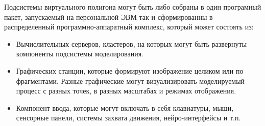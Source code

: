 Подсистемы виртуального полигона могут быть либо собраны в один програмный пакет, запускаемый на персональной ЭВМ так и сформированны в распределенный программно-аппаратный комплекс, который может состоять из:
\begin{itemize}
	\item 	Вычислительных серверов, кластеров, на которых 
			могут быть развернуты компоненты подсистемы моделирования.
	\item 	Графических станции, которые формируют изображение 
			целиком или по фрагментами. Разные графические могут 
			визуализировать моделируемый процесс с разных точек, 
			в разных масштабах и режимах отображения.
	\item 	Компонент ввода, которые могут включать в себя клавиатуры, 
			мыши, сенсорные панели, системы захвата движения, нейро-интерфейсы и т.п.
\end{itemize}





